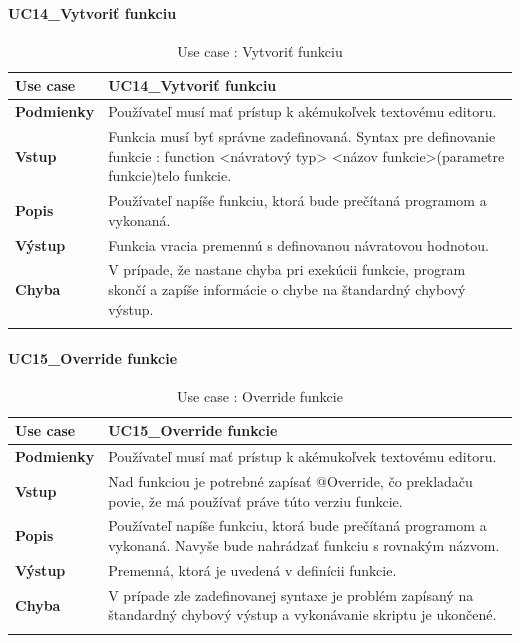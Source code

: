 \paragraph{UC14\_Vytvoriť funkciu}
\begin{center}
	\begin{longtable}{|p{2.5cm}|p{12.2cm}|}
		
			\hline
			\textbf{Use case} & UC14\_Vytvoriť funkciu \\ 
			\hline
			\textbf{Podmienky} & Používateľ musí mať prístup k akémukoľvek textovému editoru.  \\ 
			\hline
			\textbf{Vstup} & Funkcia musí byť správne zadefinovaná. 
			Syntax pre definovanie funkcie : 
			\newline
			function <návratový typ> <názov funkcie>(parametre funkcie){telo funkcie}. \\
			\hline
			
			\textbf{Popis} & Používateľ napíše funkciu, ktorá bude prečítaná programom a vykonaná.\\ 
			\hline

			\textbf{Výstup} & Funkcia vracia premennú s definovanou návratovou hodnotou.\\
			\hline
			\textbf{Chyba} & V prípade, že nastane chyba pri exekúcii funkcie, program skončí a zapíše informácie o chybe na štandardný chybový výstup.\\
			\hline
		\caption{Use case : Vytvoriť funkciu}
		\label{table:1}
		
	\end{longtable}
\end{center}
\paragraph{UC15\_Override funkcie}
\begin{center}
	\begin{longtable}{|p{2.5cm}|p{12.2cm}|}
		
			\hline
			\textbf{Use case} & UC15\_Override funkcie \\ 
			\hline
			\textbf{Podmienky} & Používateľ musí mať prístup k akémukoľvek textovému editoru.  \\ 
			\hline
			\textbf{Vstup} & Nad funkciou je potrebné zapísať @Override,  čo prekladaču povie, že má používať práve túto verziu funkcie.\\
			\hline
			
			\textbf{Popis} & Používateľ napíše funkciu, ktorá bude prečítaná programom a vykonaná. Navyše bude nahrádzať funkciu s rovnakým názvom.\\ 
			\hline
			\textbf{Výstup} & Premenná, ktorá je uvedená v definícii funkcie.\\
			\hline
			\textbf{Chyba} & V prípade zle zadefinovanej syntaxe je problém zapísaný na štandardný chybový výstup a vykonávanie skriptu je ukončené.\\
			\hline
		\caption{Use case : Override funkcie}
		\label{table:1}
		
	\end{longtable}
\end{center}
